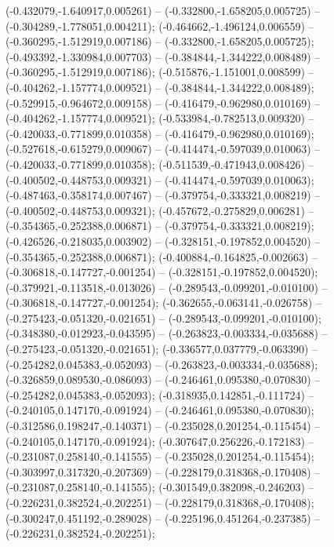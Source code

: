 (-0.432079,-1.640917,0.005261) -- (-0.332800,-1.658205,0.005725) -- (-0.304289,-1.778051,0.004211);
 (-0.464662,-1.496124,0.006559) -- (-0.360295,-1.512919,0.007186) -- (-0.332800,-1.658205,0.005725);
 (-0.493392,-1.330984,0.007703) -- (-0.384844,-1.344222,0.008489) -- (-0.360295,-1.512919,0.007186);
 (-0.515876,-1.151001,0.008599) -- (-0.404262,-1.157774,0.009521) -- (-0.384844,-1.344222,0.008489);
 (-0.529915,-0.964672,0.009158) -- (-0.416479,-0.962980,0.010169) -- (-0.404262,-1.157774,0.009521);
 (-0.533984,-0.782513,0.009320) -- (-0.420033,-0.771899,0.010358) -- (-0.416479,-0.962980,0.010169);
 (-0.527618,-0.615279,0.009067) -- (-0.414474,-0.597039,0.010063) -- (-0.420033,-0.771899,0.010358);
 (-0.511539,-0.471943,0.008426) -- (-0.400502,-0.448753,0.009321) -- (-0.414474,-0.597039,0.010063);
 (-0.487463,-0.358174,0.007467) -- (-0.379754,-0.333321,0.008219) -- (-0.400502,-0.448753,0.009321);
 (-0.457672,-0.275829,0.006281) -- (-0.354365,-0.252388,0.006871) -- (-0.379754,-0.333321,0.008219);
 (-0.426526,-0.218035,0.003902) -- (-0.328151,-0.197852,0.004520) -- (-0.354365,-0.252388,0.006871);
 (-0.400884,-0.164825,-0.002663) -- (-0.306818,-0.147727,-0.001254) -- (-0.328151,-0.197852,0.004520);
 (-0.379921,-0.113518,-0.013026) -- (-0.289543,-0.099201,-0.010100) -- (-0.306818,-0.147727,-0.001254);
 (-0.362655,-0.063141,-0.026758) -- (-0.275423,-0.051320,-0.021651) -- (-0.289543,-0.099201,-0.010100);
 (-0.348380,-0.012923,-0.043595) -- (-0.263823,-0.003334,-0.035688) -- (-0.275423,-0.051320,-0.021651);
 (-0.336577,0.037779,-0.063390) -- (-0.254282,0.045383,-0.052093) -- (-0.263823,-0.003334,-0.035688);
 (-0.326859,0.089530,-0.086093) -- (-0.246461,0.095380,-0.070830) -- (-0.254282,0.045383,-0.052093);
 (-0.318935,0.142851,-0.111724) -- (-0.240105,0.147170,-0.091924) -- (-0.246461,0.095380,-0.070830);
 (-0.312586,0.198247,-0.140371) -- (-0.235028,0.201254,-0.115454) -- (-0.240105,0.147170,-0.091924);
 (-0.307647,0.256226,-0.172183) -- (-0.231087,0.258140,-0.141555) -- (-0.235028,0.201254,-0.115454);
 (-0.303997,0.317320,-0.207369) -- (-0.228179,0.318368,-0.170408) -- (-0.231087,0.258140,-0.141555);
 (-0.301549,0.382098,-0.246203) -- (-0.226231,0.382524,-0.202251) -- (-0.228179,0.318368,-0.170408);
 (-0.300247,0.451192,-0.289028) -- (-0.225196,0.451264,-0.237385) -- (-0.226231,0.382524,-0.202251);
